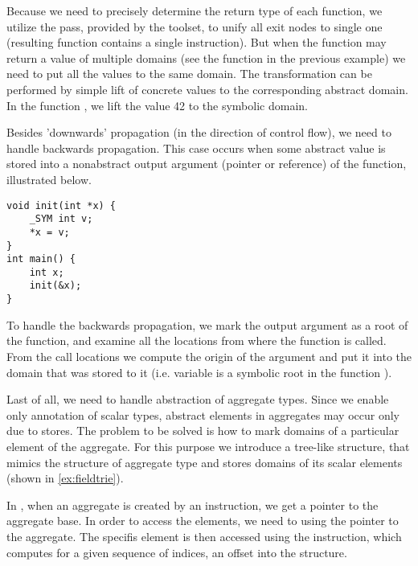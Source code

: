 Because we need to precisely determine the return type of each function, we
utilize the  pass, provided by the \LLVM toolset,
to unify all exit nodes to single one (resulting function contains a single
 instruction). But when the function may return a value of multiple
domains (see the function  in the previous example) we need to put all
the values to the same domain. The transformation can be performed by simple
lift of concrete values to the corresponding abstract domain. In the function
, we lift the value 42 to the symbolic domain.

Besides 'downwards' propagation (in the direction of control flow), we need
to handle backwards propagation. This case occurs when some abstract value is
stored into a nonabstract output argument (pointer or reference) of the function,
illustrated below.
\begin{verbatim}
void init(int *x) {
    _SYM int v;
    *x = v;
}
int main() {
    int x;
    init(&x);
}
\end{verbatim}

To handle the backwards propagation, we mark the output argument as a root of the
function, and examine all the locations from where the function is called. From
the call locations we compute the origin of the argument and put it into the
domain that was stored to it (i.e. variable  is a symbolic root
in the function ).

Last of all, we need to handle abstraction of aggregate types. Since we enable
only annotation of scalar types, abstract elements in aggregates may occur
only due to stores. The problem to be solved is how to mark domains of a
particular element of the aggregate. For this purpose we introduce a tree-like
structure, that mimics the structure of aggregate type and stores domains of
its scalar elements (shown in \autoref{ex:fieldtrie}).

In \LLVM, when an aggregate is created by an  instruction, we get a
pointer to the aggregate base. In order to access the elements, we need to
 using the pointer to the aggregate. The specifis element is then
accessed using the  instruction, which computes for a given
sequence of indices, an offset into the structure.

